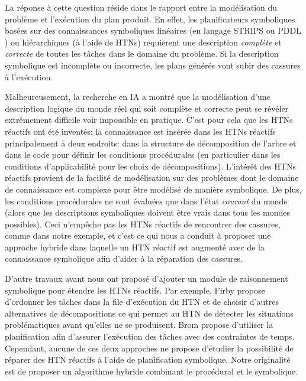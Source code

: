 \documentclass[a4paper,twoside,french]{article}
\begin{document}
		\par La réponse à cette question réside dans le rapport entre la modélisation du problème et l'exécution du plan produit. En effet, les planificateurs symboliques basées sur des connaissances symboliques linéaires (en langage STRIPS ou PDDL \cite{ghallab1998pddl}) ou hiérarchiques (à l'aide de HTNs) requièrent une description {\em complète} et {\em correcte} de toutes les tâches dans le domaine du problème. Si la description symbolique est incomplète ou incorrecte, les plans générés vont subir des cassures à l'exécution.

		\par Malheureusement, la recherche en IA \cite{gil1992acquiring} a montré que la modélisation d'une description logique du monde réel qui soit complète et correcte peut se révéler extrêmement difficile voir impossible en pratique. C'est pour cela que les HTNs réactifs ont été inventés: la connaissance est insérée dans les HTNs réactifs principalement à deux endroits: dans la structure de décomposition de l'arbre et dans le code pour définir les conditions procédurales (en particulier dans les conditions d'applicabilité pour les choix de décompositions). L'intérêt des HTNs réactifs provient de la facilité de modélisation sur des problèmes dont le domaine de connaissance est complexe pour être modélisé de manière symbolique. De plus, les conditions procédurales ne sont évaluées que dans l'état {\em courant} du monde (alors que les descriptions symboliques doivent être vrais dans tous les mondes possibles). Ceci n'empêche pas les HTNs réactifs de rencontrer des cassures, comme dans notre exemple, et c'est ce qui nous a conduit à proposer une approche hybride dans laquelle un HTN réactif est augmenté avec de la connaissance symbolique afin d'aider à la réparation des cassures.
		
		\par D'autre travaux avant nous ont proposé d'ajouter un module de raisonnement symbolique pour étendre les HTNs réactifs. Par exemple, Firby \cite{firby1987investigation} propose d'ordonner les tâches dans la file d'exécution du HTN et de choisir d'autres alternatives de décompositions ce qui permet au HTN de détecter les situations problématiques avant qu'elles ne se produisent. Brom \cite{brom2005hierarchical} propose d'utiliser la planification afin d'assurer l'exécution des tâches avec des contraintes de temps. Cependant, aucune de ces deux approches ne propose d'étudier la possibilité de réparer des HTN réactifs à l'aide de planification symbolique. Notre originalité est de proposer un algorithme hybride combinant le procédural et le symbolique.
\end{document}
